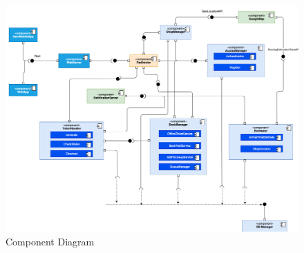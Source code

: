 \begin{figure}[H]
  \centering
  \includegraphics[width=0.9\textheight,angle =90 ,keepaspectratio]{images/all/componentview.png}
  \caption{Component Diagram}
\end{figure}